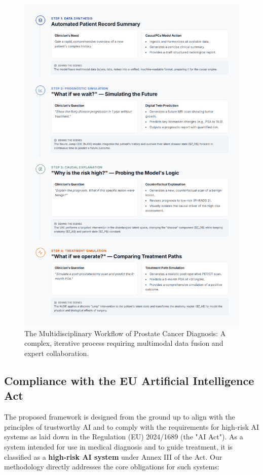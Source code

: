 \documentclass[11pt, a4paper]{article}
\begin{document}
\begin{figure}[H]
    \centering
    \includegraphics[width=\textwidth]{wf.png}
    \caption{The Multidisciplinary Workflow of Prostate Cancer Diagnosis: A complex, iterative process requiring multimodal data fusion and expert collaboration.}
    \label{fig:workflow}
\end{figure}

\subsection{Compliance with the EU Artificial Intelligence Act}
The proposed framework is designed from the ground up to align with the principles of trustworthy AI and to comply with the requirements for high-risk AI systems as laid down in the Regulation (EU) 2024/1689 (the "AI Act"). As a system intended for use in medical diagnosis and to guide treatment, it is classified as a \textbf{high-risk AI system} under Annex III of the Act. Our methodology directly addresses the core obligations for such systems:
\end{document}
